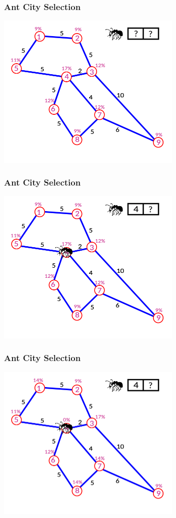\documentclass[12pt]{beamer}
\begin{document}
\begin{frame}
\frametitle{Ant City Selection}
\begin{center}
\includegraphics[height=75mm]{Images/antblack1}\\
\end{center}
\end{frame}
\begin{frame}
\frametitle{Ant City Selection}
\begin{center}
\includegraphics[height=75mm]{Images/antblack2}\\
\end{center}
\end{frame}
\begin{frame}
\frametitle{Ant City Selection}
\begin{center}
\includegraphics[height=75mm]{Images/antblack3}\\
\end{center}
\end{frame}
\end{document}
